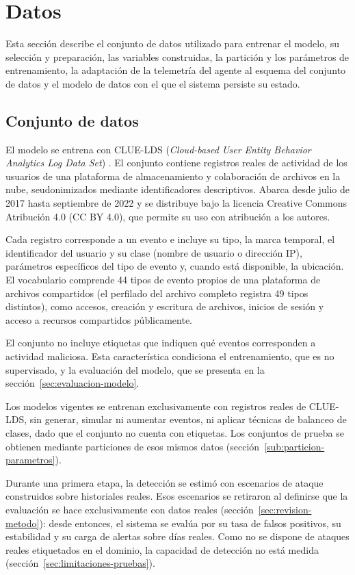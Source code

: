 \chapter{Datos}
\label{chap:datos}

Esta sección describe el conjunto de datos utilizado para entrenar el modelo, su selección y preparación, las variables construidas, la partición y los parámetros de entrenamiento, la adaptación de la telemetría del agente al esquema del conjunto de datos y el modelo de datos con el que el sistema persiste su estado.

\section{Conjunto de datos}
\label{sec:dataset}
El modelo se entrena con CLUE-LDS (\emph{Cloud-based User Entity Behavior Analytics Log Data Set}) \parencite{Landauer2022, Landauer2022Dataset}. El conjunto contiene registros reales de actividad de los usuarios de una plataforma de almacenamiento y colaboración de archivos en la nube, seudonimizados mediante identificadores descriptivos. Abarca desde julio de 2017 hasta septiembre de 2022 y se distribuye bajo la licencia Creative Commons Atribución 4.0 (CC BY 4.0), que permite su uso con atribución a los autores.

Cada registro corresponde a un evento e incluye su tipo, la marca temporal, el identificador del usuario y su clase (nombre de usuario o dirección IP), parámetros específicos del tipo de evento y, cuando está disponible, la ubicación. El vocabulario comprende 44 tipos de evento propios de una plataforma de archivos compartidos (el perfilado del archivo completo registra 49 tipos distintos), como accesos, creación y escritura de archivos, inicios de sesión y acceso a recursos compartidos públicamente.

El conjunto no incluye etiquetas que indiquen qué eventos corresponden a actividad maliciosa. Esta característica condiciona el entrenamiento, que es no supervisado, y la evaluación del modelo, que se presenta en la sección~\ref{sec:evaluacion-modelo}.

Los modelos vigentes se entrenan exclusivamente con registros reales de CLUE-LDS, sin generar, simular ni aumentar eventos, ni aplicar técnicas de balanceo de clases, dado que el conjunto no cuenta con etiquetas. Los conjuntos de prueba se obtienen mediante particiones de esos mismos datos (sección~\ref{sub:particion-parametros}).

Durante una primera etapa, la detección se estimó con escenarios de ataque construidos sobre historiales reales. Esos escenarios se retiraron al definirse que la evaluación se hace exclusivamente con datos reales (sección~\ref{sec:revision-metodo}): desde entonces, el sistema se evalúa por su tasa de falsos positivos, su estabilidad y su carga de alertas sobre días reales. Como no se dispone de ataques reales etiquetados en el dominio, la capacidad de detección no está medida (sección~\ref{sec:limitaciones-pruebas}).

